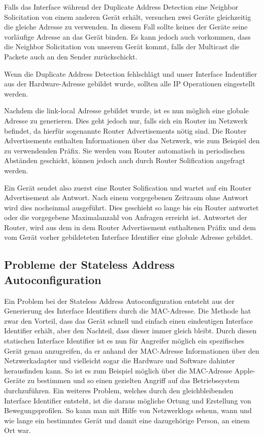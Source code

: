 \documentclass[a4paper, 12pt]{scrartcl}
\begin{document}
Falls das Interface während der Duplicate Address Detection eine Neighbor Solicitation von einem anderen Gerät erhält, versuchen zwei Geräte gleichzeitig die gleiche Adresse zu verwenden. In diesem Fall sollte keines der Geräte seine vorläufige Adresse an das Gerät binden. Es kann jedoch auch vorkommen, dass die Neighbor Solicitation von unserem Gerät kommt, falls der Multicast die Packete auch an den Sender zurückschickt.

Wenn die Duplicate Address Detection fehlschlägt und unser Interface Indentifier aus der Hardware-Adresse gebildet wurde, sollten alle IP Operationen eingestellt werden.

Nachdem die link-local Adresse gebildet wurde, ist es nun möglich eine globale Adresse zu generieren. Dies geht jedoch nur, falls sich ein Router im Netzwerk befindet, da hierfür sogenannte Router Advertisements nötig sind. Die Router Advertisements enthalten Informationen über das Netzwerk, wie zum Beispiel den zu verwendenden Präfix.
Sie werden vom Router automatisch in periodischen Abständen geschickt, können jedoch auch durch Router Solification angefragt werden.

Ein Gerät sendet also zuerst eine Router Solification und wartet auf ein Router Advertisement als Antwort. Nach einem vorgegebenen Zeitraum ohne Antwort wird dies nocheinmal ausgeführt. Dies geschieht so lange bis ein Router antwortet oder die vorgegebene Maximalanzahl von Anfragen erreicht ist. 
Antwortet der Router, wird aus dem in dem Router Advertisement enthaltenen Präfix und dem vom Gerät vorher gebildeteten Interface Identifier eine globale Adresse gebildet.



\newpage
\subsection{Probleme der Stateless Address Autoconfiguration}
Ein Problem bei der Stateless Address Autoconfiguration entsteht aus der Generierung des Interface Identifiers durch die MAC-Adresse. Die Methode hat zwar den Vorteil, dass das Gerät schnell und einfach einen eindeutigen Interface Identifier erhält, aber den Nachteil, dass dieser immer gleich bleibt.
Durch diesen statischen Interface Identifier ist es nun für Angreifer möglich ein spezifisches Gerät genau anzugreifen, da er anhand der MAC-Adresse Informationen über den Netzwerkadapter und vielleicht sogar die Hardware und Software dahinter herausfinden kann. So ist es zum Beispiel möglich über die MAC-Adresse Apple-Geräte zu bestimmen und so einen gezielten Angriff auf das Betriebssystem durchzuführen.
Ein weiteres Problem, welches durch den gleichbleibenden Interface Identifier entsteht, ist die daraus mögliche Ortung und Erstellung von Bewegungsprofilen. So kann man mit Hilfe von Netzwerklogs sehenn, wann und wie lange ein bestimmtes Gerät und damit eine dazugehörige Person, an einem Ort war.
\end{document}
